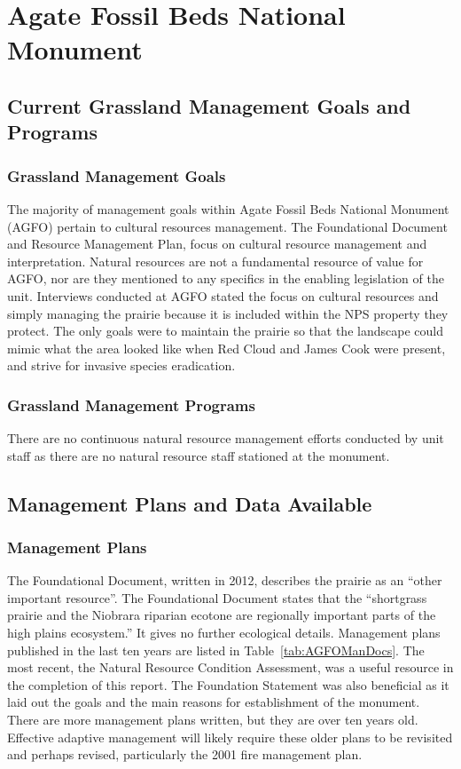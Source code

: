 \section{Agate Fossil Beds National Monument}

\subsection{Current Grassland Management Goals and Programs}

\subsubsection{Grassland Management Goals}

The majority of management goals within Agate Fossil Beds National Monument (AGFO) pertain to cultural resources management. 
The Foundational Document and Resource Management Plan, focus on cultural resource management and interpretation. 
Natural resources are not a fundamental resource of value for AGFO, nor are they mentioned to any specifics in the enabling legislation of the unit. 
Interviews conducted at AGFO stated the focus on cultural resources and simply managing the prairie because it is included within the NPS property they protect. 
The only goals were to maintain the prairie so that the landscape could mimic what the area looked like when Red Cloud and James Cook were present, and strive for invasive species eradication.

\subsubsection{Grassland Management Programs}

There are no continuous natural resource management efforts conducted by
unit staff as there are no natural resource staff stationed at the
monument.

\subsection{Management Plans and Data Available}

\subsubsection{Management Plans}

The Foundational Document, written in 2012, describes the prairie as an ``other important resource''. 
The Foundational Document states that the ``shortgrass prairie and the Niobrara riparian ecotone are regionally important parts of the high plains ecosystem.'' 
It gives no further ecological details. 
Management plans published in the last ten years are listed in Table~\ref{tab:AGFOManDocs}. 
The most recent, the Natural Resource Condition Assessment, was a useful resource in the completion of this report. 
The Foundation Statement was also beneficial as it laid out the goals and the main reasons for establishment of the monument. 
There are more management plans written, but they are over ten years old.
Effective adaptive management will likely require these older plans to be revisited and perhaps revised, particularly the 2001 fire management plan.

